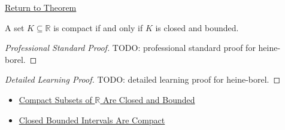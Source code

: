 \newpage
{}
\label{prf:heine-borel}

\begin{remark*}[Return]
\hyperref[thm:heine-borel]{Return to Theorem}
\end{remark*}

\begin{theorem*}
A set $K\subseteq\mathbb{R}$ is compact if and only if $K$ is closed and bounded.
\end{theorem*}

\begin{proof}[Professional Standard Proof]
\LRAProofBodyStart
TODO: professional standard proof for heine-borel.
\end{proof}

\begin{proof}[Detailed Learning Proof]
\LRAProofBodyStart
TODO: detailed learning proof for heine-borel.
\end{proof}

\begin{remark*}
\end{remark*}

\begin{dependencies}
\begin{itemize}
  \item \hyperref[thm:compact-implies-closed-bounded]{Compact Subsets of $\mathbb{R}$ Are Closed and Bounded}
  \item \hyperref[thm:closed-bounded-interval-compact]{Closed Bounded Intervals Are Compact}
\end{itemize}
\end{dependencies}

\clearpage

